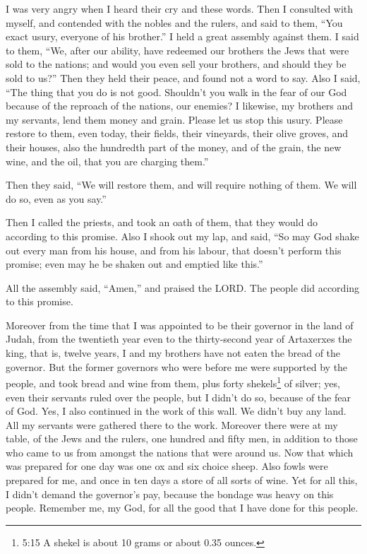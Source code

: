  I was very angry when I heard their cry and these words.
 Then I consulted with myself, and contended with the nobles
and the rulers, and said to them, ``You exact usury, everyone of his
brother.'' I held a great assembly against them.  I said to
them, ``We, after our ability, have redeemed our brothers the Jews that
were sold to the nations; and would you even sell your brothers, and
should they be sold to us?'' Then they held their peace, and found not a
word to say.  Also I said, ``The thing that you do is not
good. Shouldn't you walk in the fear of our God because of the reproach
of the nations, our enemies?  I likewise, my brothers and
my servants, lend them money and grain. Please let us stop this usury.
 Please restore to them, even today, their fields, their
vineyards, their olive groves, and their houses, also the hundredth part
of the money, and of the grain, the new wine, and the oil, that you are
charging them.''

 Then they said, ``We will restore them, and will require
nothing of them. We will do so, even as you say.''

Then I called the priests, and took an oath of them, that they would do
according to this promise.  Also I shook out my lap, and
said, ``So may God shake out every man from his house, and from his
labour, that doesn't perform this promise; even may he be shaken out and
emptied like this.''

All the assembly said, ``Amen,'' and praised the LORD. The people did
according to this promise.

 Moreover from the time that I was appointed to be their
governor in the land of Judah, from the twentieth year even to the
thirty-second year of Artaxerxes the king, that is, twelve years, I and
my brothers have not eaten the bread of the governor.  But
the former governors who were before me were supported by the people,
and took bread and wine from them, plus forty shekels\footnote{5:15 A
  shekel is about 10 grams or about 0.35 ounces.} of silver; yes, even
their servants ruled over the people, but I didn't do so, because of the
fear of God.  Yes, I also continued in the work of this
wall. We didn't buy any land. All my servants were gathered there to the
work.  Moreover there were at my table, of the Jews and the
rulers, one hundred and fifty men, in addition to those who came to us
from amongst the nations that were around us.  Now that
which was prepared for one day was one ox and six choice sheep. Also
fowls were prepared for me, and once in ten days a store of all sorts of
wine. Yet for all this, I didn't demand the governor's pay, because the
bondage was heavy on this people.  Remember me, my God, for
all the good that I have done for this people.

